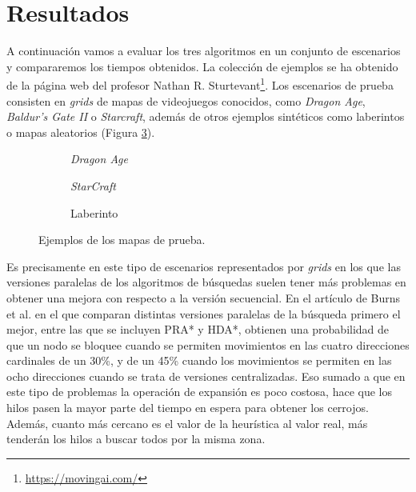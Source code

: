 \documentclass[a4paper,12pt]{article}
\begin{document}
\section{Resultados}

A continuación vamos a evaluar los tres algoritmos en un conjunto de escenarios  y compararemos los tiempos obtenidos. La colección de ejemplos se ha obtenido de la página web del profesor Nathan R. Sturtevant\footnote{\href{https://movingai.com/}{https://movingai.com/}}\cite{sturtevant2012benchmarks}. Los escenarios de prueba consisten en \textit{grids} de mapas de videojuegos conocidos, como \textit{Dragon Age}, \textit{Baldur's Gate II} o \textit{Starcraft}, además de otros ejemplos sintéticos como laberintos o mapas aleatorios (Figura \ref{fig:mapas}).

\begin{figure}[H]
    \centering
    \begin{subfigure}[b]{0.32\textwidth}
        \centering
        
        \caption{\textit{Dragon Age}}
        \label{dao}
    \end{subfigure}
    \hfill
    \begin{subfigure}[b]{0.32\textwidth}
        \centering
        
        \caption{\textit{StarCraft}}
        \label{starcraft}
    \end{subfigure}
    \hfill
    \begin{subfigure}[b]{0.32\textwidth}
        \centering
        
        \caption{Laberinto}
    \end{subfigure}
    \caption{Ejemplos de los mapas de prueba.}
    \label{fig:mapas}
\end{figure}

Es precisamente en este tipo de escenarios representados por \textit{grids} en los que las versiones paralelas de los algoritmos de búsquedas suelen tener más problemas en obtener una mejora con respecto a la versión secuencial. En el artículo de Burns et al. \cite{burns2010best} en el que comparan distintas versiones paralelas de la búsqueda primero el mejor, entre las que se incluyen PRA* y HDA*, obtienen una probabilidad de que un nodo se bloquee cuando se permiten movimientos en las cuatro direcciones cardinales de un 30\%, y de un 45\% cuando los movimientos se permiten en las ocho direcciones cuando se trata de versiones centralizadas. Eso sumado a que en este tipo de problemas la operación de expansión es poco costosa, hace que los hilos pasen la mayor parte del tiempo en espera para obtener los cerrojos. Además, cuanto más cercano es el valor de la heurística al valor real, más tenderán los hilos a buscar todos por la misma zona.
\end{document}
